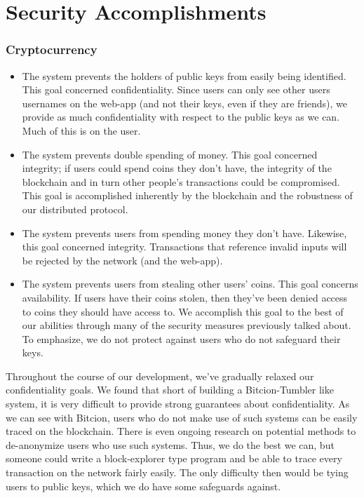 \documentclass[12pt]{article}
\begin{document}
\section{Security Accomplishments}

\subsubsection*{Cryptocurrency}
\begin{itemize}
\item The system prevents the holders of public keys from easily being identified. This goal concerned confidentiality. Since users can only see other users usernames on the web-app (and not their keys, even if they are friends), we provide as much confidentiality with respect to the public keys as we can. Much of this is on the user.
\item The system prevents double spending of money. This goal concerned integrity; if users could spend coins they don't have, the integrity of the blockchain and in turn other people's transactions could be compromised. This goal is accomplished inherently by the blockchain and the robustness of our distributed protocol.
\item The system prevents users from spending money they don't have. Likewise, this goal concerned integrity. Transactions that reference invalid inputs will be rejected by the network (and the web-app).
\item The system prevents users from stealing other users' coins. This goal concerns availability. If users have their coins stolen, then they've been denied access to coins they should have access to. We accomplish this goal to the best of our abilities through many of the security measures previously talked about. To emphasize, we do not protect against users who do not safeguard their keys.
\end{itemize}

Throughout the course of our development, we've gradually relaxed our confidentiality goals. We found that short of building a Bitcion-Tumbler like system, it is very difficult to provide strong guarantees about confidentiality. As we can see with Bitcion, users who do not make use of such systems can be easily traced on the blockchain. There is even ongoing research on potential methods to de-anonymize users who use such systems. Thus, we do the best we can, but someone could write a block-explorer type program and be able to trace every transaction on the network fairly easily. The only difficulty then would be tying users to public keys, which we do have some safeguards against.
\end{document}
